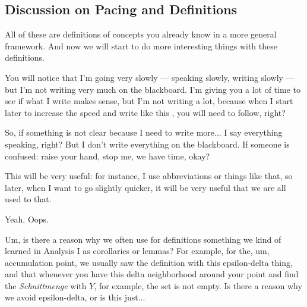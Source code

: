 \begin{hidden}
\end{hidden}

\subsection{Discussion on Pacing and Definitions}

\begin{speech}[00:26:03 - 00:27:29]
All of these are definitions of concepts you already know in a more general framework. And now we will start to do more interesting things with these definitions.

You will notice that I'm going very slowly --- speaking slowly, writing slowly --- but I'm not writing very much on the blackboard. I'm giving you a lot of time to see if what I write makes sense, but I'm not writing a lot, because when I start later to increase the speed and write like this , you will need to follow, right?

So, if something is not clear because I need to write more... I say everything speaking, right? But I don't write everything on the blackboard. If someone is confused: raise your hand, stop me, we have time, okay?
\end{speech}

\begin{speech}[00:27:29 - 00:28:00]
This will be very useful: for instance, I use abbreviations or things like that, so later, when I want to go slightly quicker, it will be very useful that we are all used to that.

Yeah.  Oops.
\end{speech}

\begin{student}
Um, is there a reason why we often use for definitions something we kind of learned in Analysis I as corollaries or lemmas? For example, for the, um, accumulation point, we usually saw the definition with this epsilon-delta thing, and that whenever you have this delta neighborhood around your point and find the \emph{Schnittmenge}  with $Y$, for example, the set is not empty. Is there a reason why we avoid epsilon-delta, or is this just...
\end{student}

